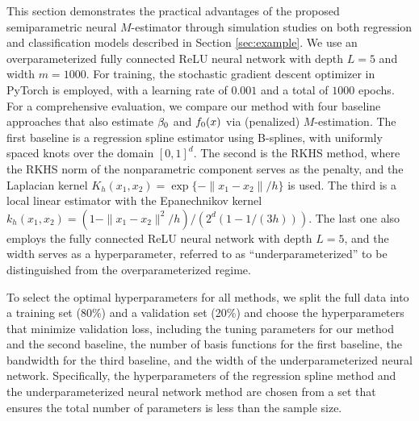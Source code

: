 This section demonstrates the practical advantages of the proposed semiparametric neural $M$-estimator through simulation studies on both regression and classification models described in Section \ref{sec:example}. We use an overparameterized fully connected ReLU neural network with depth $L=5$ and width $m=1000$. For training, the stochastic gradient descent optimizer in PyTorch is employed,  with a learning rate of $0.001$ and a total of $1000$ epochs.
For a comprehensive evaluation, we compare our method with four baseline approaches that also estimate \(\beta_{0}\) and \(f_{0}(x)\) via (penalized) $M$-estimation.
The first baseline is a regression spline estimator using B-splines, with uniformly spaced knots over the domain \([0,1]^d\). The second is the RKHS method, where the RKHS norm of the nonparametric component serves as the penalty, and the Laplacian kernel \(K_h(x_1, x_2) = \exp\{-\|x_1 - x_2\|/h\}\) is used. The third is a local linear estimator with the Epanechnikov kernel \(k_h(x_1,x_2) = (1 - \|x_1 - x_2\|^2/h)/(2^d(1 - 1/(3h)))\).
The last one also employs the fully connected ReLU neural network with depth $L=5$, and the width serves as a hyperparameter, referred to as ``underparameterized'' to be distinguished from the overparameterized regime.   

To select the optimal hyperparameters for all methods, we split the full data into a training set (80\%) and a validation set (20\%) and choose the hyperparameters that minimize validation loss, including the tuning parameters for our method and the second baseline, the number of basis functions for the first baseline, the bandwidth for the third baseline, and the width of the underparameterized neural network. 
Specifically, the hyperparameters of the regression spline method and the underparameterized neural network method are chosen from a set that ensures the total number of parameters is less than the sample size.



